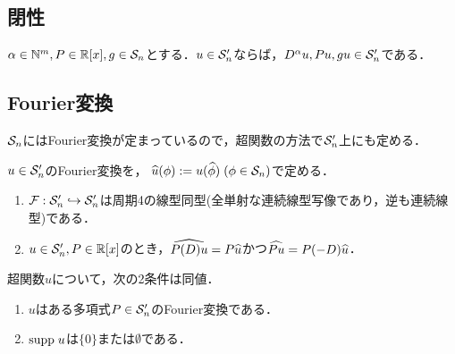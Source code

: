 \documentclass[uplatex,dvipdfmx]{jsreport}
\begin{document}
\subsection{閉性}

\begin{theorem}
    $\al\in\N^m,P\in\R[x],g\in\S_n$とする．$u\in\S'_n$ならば，$D^\al u,Pu,gu\in\S'_n$である．
\end{theorem}

\subsection{Fourier変換}

\begin{tcolorbox}[colframe=ForestGreen, colback=ForestGreen!10!white,breakable,colbacktitle=ForestGreen!40!white,coltitle=black,fonttitle=\bfseries\sffamily,
title=]
    $\S_n$にはFourier変換が定まっているので，超関数の方法で$\S'_n$上にも定める．
\end{tcolorbox}

\begin{definition}
    $u\in\S'_n$のFourier変換を，
    $\wh{u}(\phi):=u(\wh{\phi})\;(\phi\in\S_n)$で定める．
\end{definition}

\begin{theorem}\mbox{}
    \begin{enumerate}
        \item $\F:\S'_n\mono\S'_n$は周期4の線型同型(全単射な連続線型写像であり，逆も連続線型)である．
        \item $u\in\S'_n,P\in\R[x]$のとき，$\wh{P(D)u}=P\wh{u}$かつ$\wh{Pu}=P(-D)\wh{u}$．
    \end{enumerate}
\end{theorem}

\begin{example}[多項式のFourier変換]
    
\end{example}

\begin{corollary}
    超関数$u$について，次の2条件は同値．
    \begin{enumerate}
        \item $u$はある多項式$P\in\S'_n$のFourier変換である．
        \item $\supp u$は$\{0\}$または$\emptyset$である．
    \end{enumerate}
\end{corollary}
\end{document}
